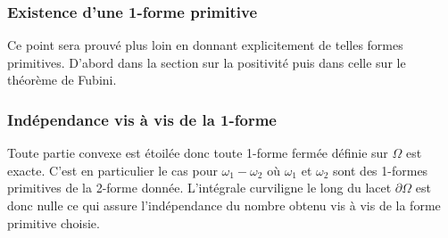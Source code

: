 \subsubsection{Existence d'une 1-forme primitive}
Ce point sera prouvé plus loin en donnant explicitement de telles formes primitives. D'abord dans la section sur la positivité puis dans celle sur le théorème de Fubini.
\subsubsection{Indépendance vis à vis de la 1-forme}
Toute partie convexe est étoilée donc toute 1-forme fermée définie sur $\Omega$ est exacte. C'est en particulier le cas pour $\omega_1 -\omega_2$ où $\omega_1$ et $\omega_2$ sont des 1-formes primitives de la 2-forme donnée. L'intégrale curviligne le long du lacet $\partial \Omega$ est donc nulle ce qui assure l'indépendance du nombre obtenu vis à vis de la forme primitive choisie.
